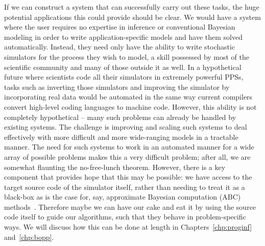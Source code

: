 If we can construct a system that can successfully carry out these tasks, 
the huge potential applications this could provide should be clear. We would have a 
system where the user requires no expertise in inference or conventional
Bayesian modeling in order to write application-specific models and have them solved automatically.
Instead, they need only have the ability to write stochastic simulators for the process they wish to
model, a skill possessed by most of the scientific community and many of those outside it as well.
In a hypothetical future where scientists
code all their simulators in extremely powerful PPSs, tasks such as
inverting those simulators and improving the simulator by incorporating real data would
be automated in the same way current compilers convert high-level coding languages to machine code.  
However, this ability is not completely
hypothetical -- many such problems can already be handled by existing systems.  The challenge
is improving and scaling such systems to deal effectively with more difficult and more wide-ranging models
in a tractable manner.  The need for such systems to work in an automated manner for a wide array
of possible problems makes this a very difficult problem; after all, we are somewhat flaunting the no-free-lunch
theorem.  However, there is a key component that provides hope that this may be possible: we have access
to the target source code of the simulator itself, rather than needing to treat it as a black-box as is the
case for, say, approximate Bayesian computation (ABC) methods~\citep{csillery2010approximate}.  Therefore
maybe we can have our cake and eat it by using the source code itself to guide our algorithms, such that
they behave in problem-specific ways.  We will discuss how this can be done at length in 
Chapters~\ref{chp:proginf} and~\ref{chp:bopp}.